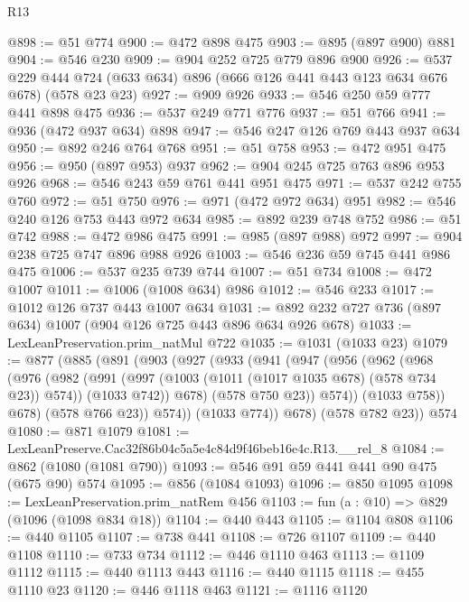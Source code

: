 \begin{lexlean}{R13}
\begin{coremodule}
@898 := @51 @774
@900 := @472 @898 @475
@903 := @895 (@897 @900) @881
@904 := @546 @230
@909 := @904 @252 @725 @779 @896 @900
@926 := @537
    @229
    @444
    @724
    (@633 @634)
    @896
    (@666 @126 @441 @443 @123 @634 @676 @678)
    (@578 @23 @23)
@927 := @909 @926
@933 := @546 @250 @59 @777 @441 @898 @475
@936 := @537 @249 @771 @776
@937 := @51 @766
@941 := @936 (@472 @937 @634) @898
@947 := @546 @247 @126 @769 @443 @937 @634
@950 := @892 @246 @764 @768
@951 := @51 @758
@953 := @472 @951 @475
@956 := @950 (@897 @953) @937
@962 := @904 @245 @725 @763 @896 @953 @926
@968 := @546 @243 @59 @761 @441 @951 @475
@971 := @537 @242 @755 @760
@972 := @51 @750
@976 := @971 (@472 @972 @634) @951
@982 := @546 @240 @126 @753 @443 @972 @634
@985 := @892 @239 @748 @752
@986 := @51 @742
@988 := @472 @986 @475
@991 := @985 (@897 @988) @972
@997 := @904 @238 @725 @747 @896 @988 @926
@1003 := @546 @236 @59 @745 @441 @986 @475
@1006 := @537 @235 @739 @744
@1007 := @51 @734
@1008 := @472 @1007
@1011 := @1006 (@1008 @634) @986
@1012 := @546 @233
@1017 := @1012 @126 @737 @443 @1007 @634
@1031 := @892 @232 @727 @736 (@897 @634) @1007 (@904 @126 @725 @443 @896 @634 @926 @678)
@1033 := LexLeanPreservation.prim_natMul @722
@1035 := @1031 (@1033 @23)
@1079 := @877
    (@885
      (@891
        (@903
          (@927
            (@933
              (@941
                (@947
                  (@956
                    (@962
                      (@968
                        (@976
                          (@982
                            (@991
                              (@997 (@1003 (@1011 (@1017 @1035 @678) (@578 @734 @23)) @574))
                              (@1033 @742))
                            @678)
                          (@578 @750 @23))
                        @574))
                    (@1033 @758))
                  @678)
                (@578 @766 @23))
              @574))
          (@1033 @774))
        @678)
      (@578 @782 @23))
    @574
@1080 := @871 @1079
@1081 := LexLeanPreserve.Cac32f86b04c5a5e4c84d9f46beb16e4c.R13.__rel_8
@1084 := @862 (@1080 (@1081 @790))
@1093 := @546 @91 @59 @441 @441 @90 @475 (@675 @90) @574
@1095 := @856 (@1084 @1093)
@1096 := @850 @1095
@1098 := LexLeanPreservation.prim_natRem @456
@1103 := fun (a : @10) => @829 (@1096 (@1098 @834 @18))
@1104 := @440 @443
@1105 := @1104 @808
@1106 := @440 @1105
@1107 := @738 @441
@1108 := @726 @1107
@1109 := @440 @1108
@1110 := @733 @734
@1112 := @446 @1110 @463
@1113 := @1109 @1112
@1115 := @440 @1113 @443
@1116 := @440 @1115
@1118 := @455 @1110 @23
@1120 := @446 @1118 @463
@1121 := @1116 @1120

\end{coremodule}
\end{lexlean}
